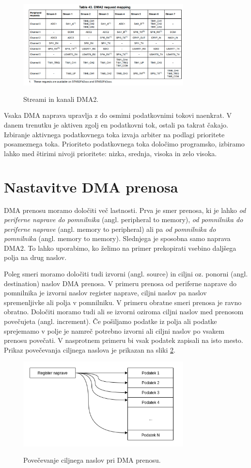\documentclass[12pt,letterpaper]{article}
\begin{document}
\begin{figure}[ht!]
  \centering
  \caption{Streami in kanali DMA2.}
  \includegraphics[width=330px]{images/vaja9/DMA2.png}
  \label{dma2_stream}
\end{figure}

Vsaka DMA naprava upravlja z do osmimi podatkovnimi tokovi naenkrat. V danem trenutku je aktiven zgolj en podatkovni tok, ostali pa takrat čakajo. Izbiranje aktivnega podatkovnega toka izvaja arbiter na podlagi prioritete posameznega toka. Prioriteto podatkovnega toka določimo programsko, izbiramo lahko med štirimi nivoji prioritete: nizka, srednja, visoka in zelo visoka.


\section*{Nastavitve DMA prenosa}

DMA prenosu moramo določiti več lastnosti. Prva je smer prenosa, ki je lahko \textit{od periferne naprave do pomnilnika} (angl. peripheral to memory), \textit{ od pomnilnika do periferne naprave} (angl. memory to peripheral) ali pa \textit{od pomnilnika do pomnilnika} (angl. memory to memory). Slednjega je sposobna samo naprava DMA2. To lahko uporabimo, ko želimo na primer prekopirati vsebino daljšega polja na drug naslov.

Poleg smeri moramo določiti tudi izvorni (angl. source) in ciljni oz. ponorni (angl. destination) naslov DMA prenosa. V primeru prenosa od periferne naprave do pomnilnika je izvorni naslov register naprave, ciljni naslov pa naslov spremenljivke ali polja v pomnilniku. V primeru obratne smeri prenosa je ravno obratno. Določiti moramo tudi ali se izvorni oziroma ciljni naslov med prenosom povečujeta (angl. increment). Če pošiljamo podatke iz polja ali podatke sprejemamo v polje je namreč potrebno izvorni ali ciljni naslov po vsakem prenosu povečati. V nasprotnem primeru bi vsak podatek zapisali na isto mesto. Prikaz povečevanja ciljnega naslova je prikazan na sliki \ref{inkrementnaslovov}.

\begin{figure}[ht!]
  \centering
  \caption{Povečevanje ciljnega naslov pri DMA prenosu.}
  \includegraphics[width=330px]{images/vaja9/inkrement_prenos.png}
  \label{inkrementnaslovov}
\end{figure}
\end{document}
